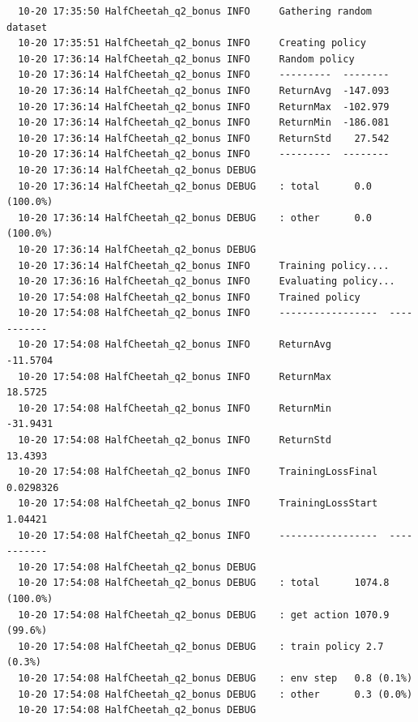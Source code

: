 \documentclass[12pt]{article}
\begin{document}
  
  \begin{lstlisting}
  10-20 17:35:50 HalfCheetah_q2_bonus INFO     Gathering random dataset
  10-20 17:35:51 HalfCheetah_q2_bonus INFO     Creating policy
  10-20 17:36:14 HalfCheetah_q2_bonus INFO     Random policy
  10-20 17:36:14 HalfCheetah_q2_bonus INFO     ---------  --------
  10-20 17:36:14 HalfCheetah_q2_bonus INFO     ReturnAvg  -147.093
  10-20 17:36:14 HalfCheetah_q2_bonus INFO     ReturnMax  -102.979
  10-20 17:36:14 HalfCheetah_q2_bonus INFO     ReturnMin  -186.081
  10-20 17:36:14 HalfCheetah_q2_bonus INFO     ReturnStd    27.542
  10-20 17:36:14 HalfCheetah_q2_bonus INFO     ---------  --------
  10-20 17:36:14 HalfCheetah_q2_bonus DEBUG    
  10-20 17:36:14 HalfCheetah_q2_bonus DEBUG    : total      0.0 (100.0%)
  10-20 17:36:14 HalfCheetah_q2_bonus DEBUG    : other      0.0 (100.0%)
  10-20 17:36:14 HalfCheetah_q2_bonus DEBUG    
  10-20 17:36:14 HalfCheetah_q2_bonus INFO     Training policy....
  10-20 17:36:16 HalfCheetah_q2_bonus INFO     Evaluating policy...
  10-20 17:54:08 HalfCheetah_q2_bonus INFO     Trained policy
  10-20 17:54:08 HalfCheetah_q2_bonus INFO     -----------------  -----------
  10-20 17:54:08 HalfCheetah_q2_bonus INFO     ReturnAvg          -11.5704
  10-20 17:54:08 HalfCheetah_q2_bonus INFO     ReturnMax           18.5725
  10-20 17:54:08 HalfCheetah_q2_bonus INFO     ReturnMin          -31.9431
  10-20 17:54:08 HalfCheetah_q2_bonus INFO     ReturnStd           13.4393
  10-20 17:54:08 HalfCheetah_q2_bonus INFO     TrainingLossFinal    0.0298326
  10-20 17:54:08 HalfCheetah_q2_bonus INFO     TrainingLossStart    1.04421
  10-20 17:54:08 HalfCheetah_q2_bonus INFO     -----------------  -----------
  10-20 17:54:08 HalfCheetah_q2_bonus DEBUG    
  10-20 17:54:08 HalfCheetah_q2_bonus DEBUG    : total      1074.8 (100.0%)
  10-20 17:54:08 HalfCheetah_q2_bonus DEBUG    : get action 1070.9 (99.6%)
  10-20 17:54:08 HalfCheetah_q2_bonus DEBUG    : train policy 2.7 (0.3%)
  10-20 17:54:08 HalfCheetah_q2_bonus DEBUG    : env step   0.8 (0.1%)
  10-20 17:54:08 HalfCheetah_q2_bonus DEBUG    : other      0.3 (0.0%)
  10-20 17:54:08 HalfCheetah_q2_bonus DEBUG    
  
  \end{lstlisting}
  
	
\end{document}
